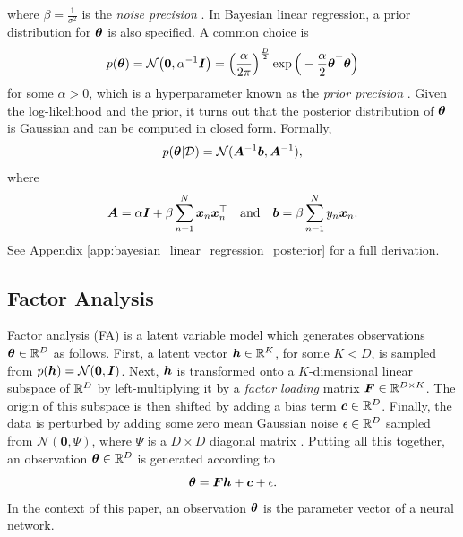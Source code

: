 \documentclass[10pt]{article} %
\begin{document}
where $\beta = \frac{1}{\sigma^2}$ is the \emph{noise precision} \citep{barber2007}. In Bayesian linear regression, a prior distribution for ${\bm{\theta}}$ is also specified. A common choice  is 
\begin{equation}
\label{eqn:linear_regression_prior}
    p({\bm{\theta}}) = \mathcal{N}\big(\mathbf{0}, \alpha^{-1} {\bm{I}} \big) = \Big(\frac{\alpha}{2\pi}\Big)^{\frac{D}{2}} \exp\Big(-\frac{\alpha}{2} {\bm{\theta}}^\top {\bm{\theta}} \Big)
\end{equation}
for some $\alpha > 0$, which is a hyperparameter known as the \emph{prior precision} \citep{barber2007}. Given the log-likelihood and the prior, it turns out that the posterior distribution of ${\bm{\theta}}$ is Gaussian and can be computed in closed form. Formally, 
\begin{equation}
\label{eqn:linear_regression_posterior}
    p({\bm{\theta}} | \mathcal{D}) = \mathcal{N}( {\bm{A}}^{-1} {\bm{b}}, {\bm{A}}^{-1}),
\end{equation}
where
\begin{equation}
\label{eqn:linear_model_A_and_b}
    {\bm{A}} = \alpha {\bm{I}} + \beta \sum_{n=1}^N {\bm{x}}_n {\bm{x}}_n^\top \quad \text{and} \quad {\bm{b}} = \beta \sum_{n=1}^N y_n {\bm{x}}_n.
\end{equation}
See Appendix \ref{app:bayesian_linear_regression_posterior} for a full derivation.
\subsection{Factor Analysis}
\label{sec:fa}

Factor analysis (FA) is a latent variable model which generates observations ${\bm{\theta}} \in \mathbb{R}^D$ as follows. First, a latent vector ${\bm{h}} \in \mathbb{R}^K$, for some $K < D$, is sampled from $p({\bm{h}}) = \mathcal{N}(\mathbf{0}, {\bm{I}})$. Next, ${\bm{h}}$ is transformed onto a $K$-dimensional linear subspace of $\mathbb{R}^D$ by left-multiplying it by a \emph{factor loading} matrix ${\bm{F}} \in \mathbb{R}^{D \times K}$. The origin of this subspace is then shifted by adding a bias term ${\bm{c}} \in \mathbb{R}^D$. Finally, the data is perturbed by adding some zero mean Gaussian noise $\mathbf{\epsilon} \in \mathbb{R}^D$ sampled from $\mathcal{N}(\mathbf{0}, \Psi)$, where $\Psi$ is a $D\times D$ diagonal matrix \citep{barber2007}. Putting all this together, an observation ${\bm{\theta}} \in \mathbb{R}^D$ is generated according to 
\begin{equation}\label{eqn:fa_model}
	{\bm{\theta}} = {\bm{F}} {\bm{h}} + {\bm{c}} + \mathbf{\epsilon}.
\end{equation}
In the context of this paper, an observation ${\bm{\theta}}$ is the parameter vector of a neural network. 
\end{document}
